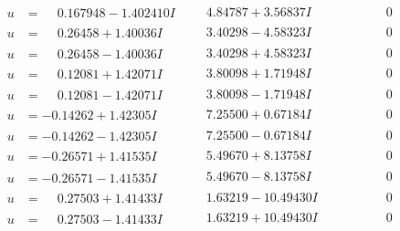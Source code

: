 \documentclass[1p]{elsarticle_modified}
\theoremstyle{definition}
\begin{document}
$$\begin{array}{c|c|c}
\begin{aligned}
u &= \phantom{-}0.167948 - 1.402410 I\end{aligned}
 & \phantom{-}4.84787 + 3.56837 I & \phantom{-0.000000 } 0 \\ \hline\begin{aligned}
u &= \phantom{-}0.26458 + 1.40036 I\end{aligned}
 & \phantom{-}3.40298 - 4.58323 I & \phantom{-0.000000 } 0 \\ \hline\begin{aligned}
u &= \phantom{-}0.26458 - 1.40036 I\end{aligned}
 & \phantom{-}3.40298 + 4.58323 I & \phantom{-0.000000 } 0 \\ \hline\begin{aligned}
u &= \phantom{-}0.12081 + 1.42071 I\end{aligned}
 & \phantom{-}3.80098 + 1.71948 I & \phantom{-0.000000 } 0 \\ \hline\begin{aligned}
u &= \phantom{-}0.12081 - 1.42071 I\end{aligned}
 & \phantom{-}3.80098 - 1.71948 I & \phantom{-0.000000 } 0 \\ \hline\begin{aligned}
u &= -0.14262 + 1.42305 I\end{aligned}
 & \phantom{-}7.25500 + 0.67184 I & \phantom{-0.000000 } 0 \\ \hline\begin{aligned}
u &= -0.14262 - 1.42305 I\end{aligned}
 & \phantom{-}7.25500 - 0.67184 I & \phantom{-0.000000 } 0 \\ \hline\begin{aligned}
u &= -0.26571 + 1.41535 I\end{aligned}
 & \phantom{-}5.49670 + 8.13758 I & \phantom{-0.000000 } 0 \\ \hline\begin{aligned}
u &= -0.26571 - 1.41535 I\end{aligned}
 & \phantom{-}5.49670 - 8.13758 I & \phantom{-0.000000 } 0 \\ \hline\begin{aligned}
u &= \phantom{-}0.27503 + 1.41433 I\end{aligned}
 & \phantom{-}1.63219 - 10.49430 I & \phantom{-0.000000 } 0 \\ \hline\begin{aligned}
u &= \phantom{-}0.27503 - 1.41433 I\end{aligned}
 & \phantom{-}1.63219 + 10.49430 I & \phantom{-0.000000 } 0 \\ \hline\begin{aligned}

\end{aligned}
\end{array}$$
\end{document}

